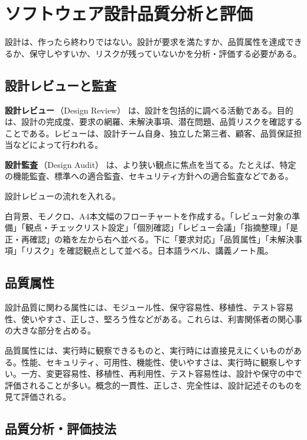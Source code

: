 \documentclass[10.5pt,a4paper]{ltjsarticle}
\newcommand{\term}[2]{\textbf{#1}\,（#2）}
\begin{document}
\section{ソフトウェア設計品質分析と評価}

設計は、作ったら終わりではない。設計が要求を満たすか、品質属性を達成できるか、保守しやすいか、リスクが残っていないかを分析・評価する必要がある。

\subsection{設計レビューと監査}

\term{設計レビュー}{Design Review} は、設計を包括的に調べる活動である。目的は、設計の完成度、要求の網羅、未解決事項、潜在問題、品質リスクを確認することである。レビューは、設計チーム自身、独立した第三者、顧客、品質保証担当などによって行われる。

\term{設計監査}{Design Audit} は、より狭い観点に焦点を当てる。たとえば、特定の機能監査、標準への適合監査、セキュリティ方針への適合監査などである。

\begin{todobox}
設計レビューの流れを入れる。
\end{todobox}
\begin{promptbox}
白背景、モノクロ、A4本文幅のフローチャートを作成する。「レビュー対象の準備」「観点・チェックリスト設定」「個別確認」「レビュー会議」「指摘整理」「是正・再確認」の箱を左から右へ並べる。下に「要求対応」「品質属性」「未解決事項」「リスク」を確認観点として並べる。日本語ラベル、講義ノート風。
\end{promptbox}

\subsection{品質属性}

設計品質に関わる属性には、モジュール性、保守容易性、移植性、テスト容易性、使いやすさ、正しさ、堅ろう性などがある。これらは、利害関係者の関心事の大きな部分を占める。

品質属性には、実行時に観察できるものと、実行時には直接見えにくいものがある。性能、セキュリティ、可用性、機能性、使いやすさは、実行時に観察しやすい。一方、変更容易性、移植性、再利用性、テスト容易性は、設計や保守の中で評価されることが多い。概念的一貫性、正しさ、完全性は、設計記述そのものを見て評価される。

\subsection{品質分析・評価技法}
\end{document}
